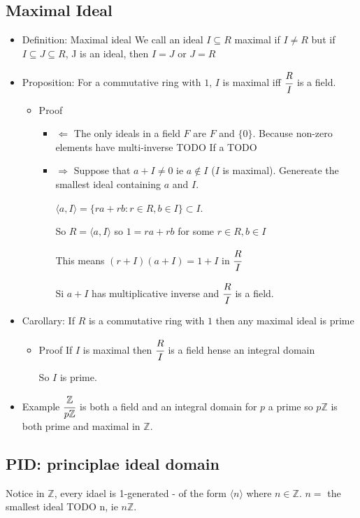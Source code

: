 \documentclass[11pt]{article}
\newcommand{\cf}[2]{\ensuremath{\cfrac{#1}{#2}}}
\newcommand{\la}{\ensuremath{\langle}}
\newcommand{\ra}{\ensuremath{\rangle}}
\newcommand{\Ra}{\ensuremath{\Rightarrow}}
\newcommand{\La}{\ensuremath{\Leftarrow}}
\newcommand{\ZZ}{\ensuremath{\mathbb{Z}}}
\begin{document}
\subsection{Maximal Ideal}
\label{sec:orgf60c60c}
\begin{itemize}
\item Definition: Maximal ideal
We call an ideal \(I \subseteq R\) maximal if \(I \neq R\) but if \(I \subseteq J \subseteq R\),
J is an ideal, then \(I = J\) or \(J = R\)

\item Proposition:
For a commutative ring with \(1\), \(I\) is maximal iff \(\cfrac{R}{I}\) is a field.
\begin{itemize}
\item Proof
\begin{itemize}
\item \(\La\)
The only ideals in a field \(F\) are \(F\) and \(\{0\}\).
Because non-zero elements have multi-inverse
TODO
If a TODO

\item \(\Ra\)
Suppose that \(a + I \neq 0\) ie \(a \notin I\) (\(I\) is maximal).
Genereate the smallest ideal containing \(a\) and \(I\).

\(\la a , I\ra = \{ ra + rb: r \in R, b \in I \} \subset I\).

So \(R = \la a , I\ra\) so \(1 = ra + rb\) for some \(r \in R, b \in I\)

This means \((r + I)(a + I) = 1 + I\) in \(\cfrac{R}{I}\)

Si \(a + I\) has multiplicative inverse and \(\cfrac{R}{I}\) is a field.
\end{itemize}
\end{itemize}

\item Carollary:
If \(R\) is a commutative ring with \(1\) then any maximal ideal is prime
\begin{itemize}
\item Proof
If \(I\) is maximal then \(\cf{R}{I}\) is a field hense an integral domain

So \(I\) is prime.
\end{itemize}

\item Example
\(\cf{\ZZ}{p\ZZ}\) is both a field and an integral domain for \(p\) a prime
so \(p\ZZ\) is both prime and maximal in \(\ZZ\).
\end{itemize}
\subsection{PID: principlae ideal domain}
\label{sec:orgf5c546c}
Notice in \(\ZZ\), every idael is 1-generated - of the form \(\la n \ra\) where \(n \in \ZZ\).
$n =$ the smallest ideal TODO n, ie \(n\ZZ\).
\end{document}
